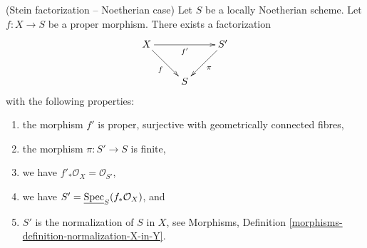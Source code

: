 \begin{theorem}
\label{theorem-stein-factorization-Noetherian}
(Stein factorization -- Noetherian case)
Let $S$ be a locally Noetherian scheme.
Let $f : X \to S$ be a proper morphism.
There exists a factorization
$$
\xymatrix{
X \ar[rr]_{f'} \ar[rd]_f & & S' \ar[dl]^\pi \\
& S &
}
$$
with the following properties:
\begin{enumerate}
\item the morphism $f'$ is proper, surjective
with geometrically connected fibres,
\item the morphism $\pi : S' \to S$ is finite,
\item we have $f'_*\mathcal{O}_X = \mathcal{O}_{S'}$,
\item we have $S' = \underline{\mathop{\rm Spec}}_S(f_*\mathcal{O}_X)$, and
\item $S'$ is the normalization of $S$ in $X$, see
Morphisms, Definition \ref{morphisms-definition-normalization-X-in-Y}.
\end{enumerate}
\end{theorem}

